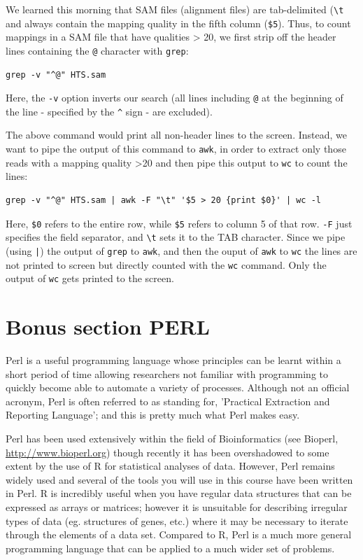 \documentclass[11pt]{article}
\begin{document}
We learned this morning that SAM files (alignment files) are
 tab-delimited (\texttt{\textbackslash{}t} and always contain the mapping quality in the
 fifth column (\texttt{\$5}). Thus, to count mappings in a SAM file that
 have qualities > 20, we first strip off the header lines
 containing the \texttt{@} character  with \texttt{grep}:

\begin{verbatim}
grep -v "^@" HTS.sam
\end{verbatim}

Here, the \texttt{-v} option inverts our search (all lines including \texttt{@} at
the beginning of the line - specified by the \texttt{\textasciicircum{}} sign - are excluded).

The above command would print all non-header lines to the
screen. Instead, we want to pipe the output of this command to \texttt{awk},
in order to extract only those reads with a mapping quality >20 and
then pipe this output to \texttt{wc} to count the lines:

\begin{verbatim}
grep -v "^@" HTS.sam | awk -F "\t" '$5 > 20 {print $0}' | wc -l
\end{verbatim}

Here, \texttt{\$0} refers to the entire row, while \texttt{\$5} refers to column 5 of
that row. \texttt{-F} just specifies the field separator, and
\texttt{\textbackslash{}t} sets it to the TAB character. Since we pipe (using \texttt{|}) the output of \texttt{grep} to
\texttt{awk}, and then the ouput of \texttt{awk} to \texttt{wc} the lines are not printed to screen but directly
counted with the \texttt{wc} command. Only the output of \texttt{wc} gets printed to the screen.
\section{Bonus section PERL}
\label{sec-5}
Perl is a useful programming language whose principles can be learnt
within a short period of time allowing researchers not familiar with
programming to quickly become able to automate a variety of processes.
Although not an official acronym, Perl is often referred to as standing
for, 'Practical Extraction and Reporting Language'; and this is pretty much
what Perl makes easy.

Perl has been used extensively within the field of Bioinformatics (see
Bioperl, \url{http://www.bioperl.org}) though recently it has been overshadowed to
some extent by the use of R for statistical analyses of data. However,
Perl remains widely used and several of the tools you will use in this
course have been written in Perl. R is incredibly useful when you have
regular data structures that can be expressed as arrays or matrices;
however it is unsuitable for describing irregular types of data (eg.
structures of genes, etc.) where it may be necessary to iterate through
the elements of a data set. Compared to R, Perl is a much more general
programming language that can be applied to a much wider set of
problems.
\end{document}
